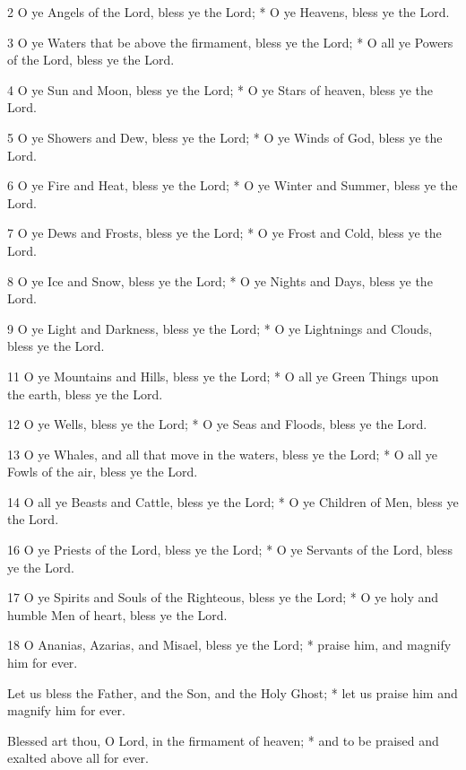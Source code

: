 2 O ye Angels of the Lord, bless ye the Lord; * O ye Heavens, bless ye the Lord.

3 O ye Waters that be above the firmament, bless ye the Lord; * O all ye Powers of the Lord, bless ye the Lord.

4 O ye Sun and Moon, bless ye the Lord; * O ye Stars of heaven, bless ye the Lord.

5 O ye Showers and Dew, bless ye the Lord; * O ye Winds of God, bless ye the Lord.

6 O ye Fire and Heat, bless ye the Lord; * O ye Winter and Summer, bless ye the Lord.

7 O ye Dews and Frosts, bless ye the Lord; * O ye Frost and Cold, bless ye the Lord.

8 O ye Ice and Snow, bless ye the Lord; * O ye Nights and Days, bless ye the Lord.

9 O ye Light and Darkness, bless ye the Lord; * O ye Lightnings and Clouds, bless ye the Lord.


11 O ye Mountains and Hills, bless ye the Lord; * O all ye Green Things upon the earth, bless ye the Lord.

12 O ye Wells, bless ye the Lord; * O ye Seas and Floods, bless ye the Lord.

13 O ye Whales, and all that move in the waters, bless ye the Lord; * O all ye Fowls of the air, bless ye the Lord.

14 O all ye Beasts and Cattle, bless ye the Lord; * O ye Children of Men, bless ye the Lord.


16 O ye Priests of the Lord, bless ye the Lord; * O ye Servants of the Lord, bless ye the Lord.

17 O ye Spirits and Souls of the Righteous, bless ye the Lord; * O ye holy and humble Men of heart, bless ye the Lord.

18 O Ananias, Azarias, and Misael, bless ye the Lord; * praise him, and magnify him for ever.

Let us bless the Father, and the Son, and the Holy Ghost; * let us praise him and magnify him for ever.

Blessed art thou, O Lord, in the firmament of heaven; * and to be praised and exalted above all for ever.


